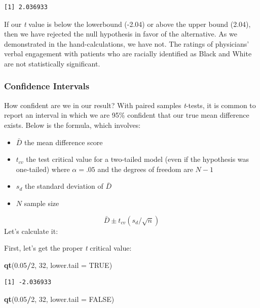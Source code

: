 \documentclass[
  11pt,
]{book}
\newenvironment{Shaded}{\begin{snugshade}}{\end{snugshade}}
\newcommand{\AttributeTok}[1]{\textcolor[rgb]{0.27,0.27,0.27}{#1}}
\newcommand{\ConstantTok}[1]{\textcolor[rgb]{0.37,0.37,0.37}{#1}}
\newcommand{\DecValTok}[1]{\textcolor[rgb]{0.06,0.06,0.06}{#1}}
\newcommand{\FloatTok}[1]{\textcolor[rgb]{0.06,0.06,0.06}{#1}}
\newcommand{\FunctionTok}[1]{\textcolor[rgb]{0.27,0.27,0.27}{\textbf{#1}}}
\newcommand{\NormalTok}[1]{#1}
\newcommand{\SpecialCharTok}[1]{\textcolor[rgb]{0.43,0.43,0.43}{\textbf{#1}}}
\providecommand{\tightlist}{%
  \setlength{\itemsep}{0pt}\setlength{\parskip}{0pt}}
\begin{document}
\begin{verbatim}
[1] 2.036933
\end{verbatim}

If our \emph{t} value is below the lowerbound (-2.04) or above the upper bound (2.04), then we have rejected the null hypothesis in favor of the alternative. As we demonstrated in the hand-calculations, we have not. The ratings of physicians' verbal engagement with patients who are racially identified as Black and White are not statistically significant.

\hypertarget{confidence-intervals-2}{%
\subsubsection{Confidence Intervals}\label{confidence-intervals-2}}

How confident are we in our result? With paired samples \emph{t}-tests, it is common to report an interval in which we are 95\% confident that our true mean difference exists. Below is the formula, which involves:

\begin{itemize}
\tightlist
\item
  \(\bar{D}\) the mean difference score
\item
  \(t_{cv}\) the test critical value for a two-tailed model (even if the hypothesis was one-tailed) where \(\alpha = .05\) and the degrees of freedom are \(N-1\)
\item
  \(s_{d}\) the standard deviation of \(\bar{D}\)
\item
  \(N\) sample size
\end{itemize}

\[\bar{D}\pm t_{cv}(s_{d}/\sqrt{n})\] Let's calculate it:

First, let's get the proper \emph{t} critical value:

\begin{Shaded}
\begin{Highlighting}[]
\FunctionTok{qt}\NormalTok{(}\FloatTok{0.05}\SpecialCharTok{/}\DecValTok{2}\NormalTok{, }\DecValTok{32}\NormalTok{, }\AttributeTok{lower.tail =} \ConstantTok{TRUE}\NormalTok{)}
\end{Highlighting}
\end{Shaded}

\begin{verbatim}
[1] -2.036933
\end{verbatim}

\begin{Shaded}
\begin{Highlighting}[]
\FunctionTok{qt}\NormalTok{(}\FloatTok{0.05}\SpecialCharTok{/}\DecValTok{2}\NormalTok{, }\DecValTok{32}\NormalTok{, }\AttributeTok{lower.tail =} \ConstantTok{FALSE}\NormalTok{)}
\end{Highlighting}
\end{Shaded}
\end{document}
